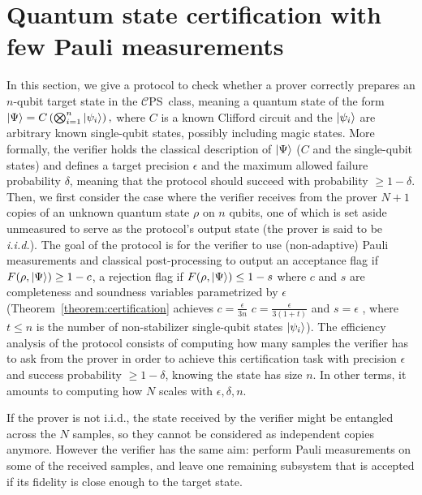 \documentclass[a4paper,twocolumn,11pt,unpublished]{../../revision/quantumarticle}
\newcommand{\CEPS}{$\mathcal C$PS}
\providecommand{\DIFadd}[1]{{\protect\color{blue} \sf #1}} %
\providecommand{\DIFdel}[1]{{\protect\color{red} \scriptsize #1}} %
\providecommand{\DIFaddbegin}{} %
\providecommand{\DIFaddend}{} %
\providecommand{\DIFdelbegin}{} %
\providecommand{\DIFdelend}{} %
\begin{document}
\section{Quantum state certification with few Pauli measurements}
\label{section:certification}
In this section, we give a protocol to check whether a prover correctly prepares an $n$-qubit target state in the \CEPS\ class, meaning a quantum state of the form
        \(
        \ket{\Psi} = C\left(\bigotimes_{i=1}^n \ket{\psi_i}\right),
        \)
        where $C$ is a known Clifford circuit and the $\ket{\psi_i}$ are arbitrary known single-qubit states, possibly including magic states.
        More formally, 
%
%
the verifier holds the classical description of $\ket\Psi$ ($C$ and the single-qubit states) and defines a target precision $\epsilon$ and the maximum allowed failure probability $\delta$, meaning that the protocol should succeed with probability $\geq 1-\delta$. Then, we first consider the case where the verifier receives from the prover $N+1$ copies of an unknown quantum state $\rho$ on $n$ qubits, one of which is set aside unmeasured to serve as the protocol's output state (the prover is said to be \textit{i.i.d.}).
%
The goal of the protocol is for the verifier to use (non-adaptive) Pauli measurements and classical post-processing to output an acceptance flag if $F(\rho, \ket\Psi) \geq 1-c$, a rejection flag if $F(\rho, \ket\Psi)\leq 1-s$ where $c$ and $s$ are completeness and soundness variables parametrized by $\epsilon$ (Theorem~\ref{theorem:certification} achieves \DIFdelbegin \DIFdel{$c=\frac{\epsilon}{3n}$ }\DIFdelend \DIFaddbegin \DIFadd{$c=\frac{\epsilon}{3(1+t)}$ }\DIFaddend and $s=\epsilon$\DIFaddbegin \DIFadd{, where $t\le n$ is the number of non-stabilizer single-qubit states $\ket{\psi_i}$}\DIFaddend ).
The efficiency analysis of the protocol consists of computing how many samples the verifier has to ask from the prover in order to achieve this certification task with precision $\epsilon$ and success probability $\geq1-\delta$, knowing the state has size $n$. In other terms, it amounts to computing how $N$ scales with $\epsilon, \delta, n$.

If the prover is not i.i.d., the state received by the verifier might be entangled across the $N$ samples, so they cannot be considered as independent copies anymore. However the verifier has the same aim: perform Pauli measurements on some of the received samples, and leave one remaining subsystem that is accepted if its fidelity is close enough to the target state.
\end{document}

